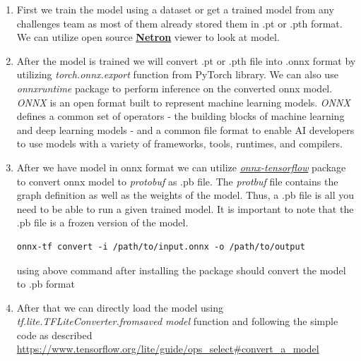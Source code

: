 \begin{enumerate}

\item First we train the model using a dataset or get a trained model from any challenges team as most of them already stored them in .pt or .pth format. 
\break We can utilize open source \textbf{\href{https://netron.app/}{Netron}} viewer to look at model. 
\item After the model is trained we will convert .pt or .pth file into .onnx format by utilizing \textit{torch.onnx.export} function from PyTorch library. We can also use \textit{onnxruntime} package to perform inference on the converted onnx model.  
\break
\textit{ONNX} is an open format built to represent machine learning models. \textit{ONNX} defines a common set of operators - the building blocks of machine learning and deep learning models - and a common file format to enable AI developers to use models with a variety of frameworks, tools, runtimes, and compilers. 
\item After we have model in onnx format we can utilize \textit{\href{https://github.com/onnx/onnx-tensorflow}{onnx-tensorflow}} package to convert onnx model to \textit{protobuf} as .pb file. The \textit{protbuf} file contains the graph definition as well as the weights of the model. Thus, a .pb file is all you need to be able to run a given trained model. It is important to note that the .pb file is a frozen version of the model.

\begin{verbatim}
onnx-tf convert -i /path/to/input.onnx -o /path/to/output
\end{verbatim}

using above command after installing the package should convert the model to .pb format
\item After that we can directly load the model using\\ \textit{tf.lite.TFLiteConverter.from\textunderscore saved \textunderscore model} function and following the simple code as described 
\url{https://www.tensorflow.org/lite/guide/ops_select#convert_a_model}
\end{enumerate}

\newpage


